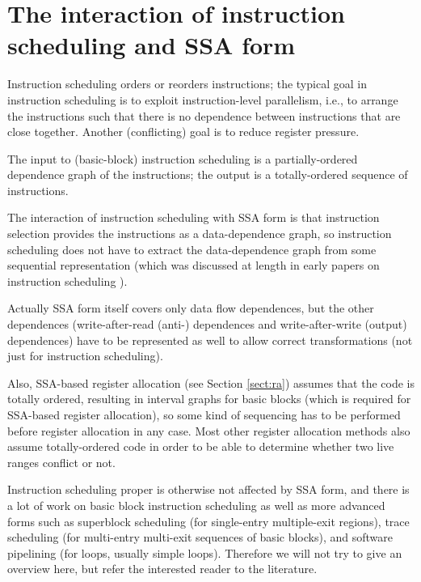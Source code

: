 \chapter{The interaction of instruction scheduling and SSA form }
%

Instruction scheduling orders or reorders instructions; the typical
goal in instruction scheduling is to exploit instruction-level
parallelism, i.e., to arrange the instructions such that there is no
dependence between instructions that are close together.  Another
(conflicting) goal is to reduce register pressure.

The input to (basic-block) instruction scheduling is a
partially-ordered dependence graph of the instructions; the output is
a totally-ordered sequence of instructions.

The interaction of instruction scheduling with SSA form is that
instruction selection provides the instructions as a data-dependence
graph, so instruction scheduling does not have to extract the
data-dependence graph from some sequential representation (which was
discussed at length in early papers on instruction scheduling
\cite{...}).

Actually SSA form itself covers only data flow dependences, but the
other dependences (write-after-read (anti-) dependences and
write-after-write (output) dependences) have to be represented as well
to allow correct transformations (not just for instruction
scheduling).

Also, SSA-based register allocation (see Section \ref{sect:ra})
assumes that the code is totally ordered, resulting in interval graphs
for basic blocks (which is required for SSA-based register
allocation), so some kind of sequencing has to be performed before
register allocation in any case.  Most other register allocation
methods also assume totally-ordered code in order to be able to
determine whether two live ranges conflict or not.

Instruction scheduling proper is otherwise not affected by SSA form,
and there is a lot of work on basic block instruction scheduling
\cite{...} as well as more advanced forms such as superblock
scheduling \cite{...} (for single-entry multiple-exit regions), trace
scheduling \cite{...} (for multi-entry multi-exit sequences of basic
blocks), and software pipelining \cite{...} (for loops, usually simple
loops).  Therefore we will not try to give an overview here, but refer
the interested reader to the literature.
